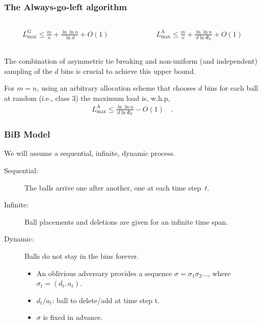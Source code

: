 \documentclass[serif,professionalfonts]{beamer}
\newcommand\load{L_{\mathrm{max}}}
\newcommand\loadG{\load^{\mathrm{G}}}
\newcommand\loadAgl{\load^{\mathrm{A}}}
\begin{document}
\begin{frame}
\frametitle{The Always-go-left algorithm}
\begin{columns}[onlytextwidth]
\begin{column}{0.5\textwidth}
\begin{align*}
\loadG \leq \frac{m}{n} + \frac{\ln \ln n}{\ln d} + O(1) 
\end{align*}
\end{column}
\begin{column}{0.5\textwidth}
\begin{align*}
\loadAgl \leq \frac{m}{n} + \frac{\ln \ln n}{d \ln \Phi_d} + O(1)
\end{align*}
\end{column}
\end{columns}
\bigskip
The combination of \alert{asymmetric tie breaking} and \alert{non-uniform} (and independent) sampling of the $d$ bins is crucial to achieve this upper bound.
\bigskip
\begin{theorem}[V\"ocking, 2003]
For $m=n$, using an arbitrary allocation scheme that chooses $d$ bins for each ball at random (i.e., class 3) the maximum load is, w.h.p,
\begin{align*}
\loadAgl \leq \frac{\ln \ln n}{d \ln \Phi_d} - O(1) \quad .
\end{align*}
\end{theorem}
\end{frame}

\begin{frame}
\frametitle{BiB Model}
We will assume a sequential, infinite, dynamic process.

\begin{description}
\item[Sequential:] The balls arrive one after another, one at each time step~$t$.
\item[Infinite:] Ball placements and deletions are given for an infinite time span.
\item[Dynamic:] Balls do not stay in the bins forever.
\begin{itemize}
\item An oblivious adversary provides a sequence $\sigma = \sigma_1 \sigma_2 \dots$, where $\sigma_t = (d_t, a_t)$.
\item $d_t$/$a_t$: ball to delete/add at time step t. \\
\item $\sigma$ is fixed in advance.
\end{itemize}
\end{description}
\end{frame}
\end{document}

